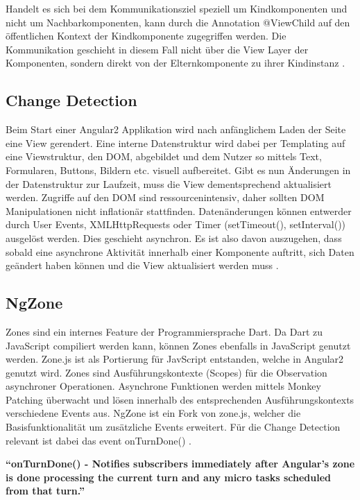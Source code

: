 Handelt es sich bei dem Kommunikationsziel speziell um Kindkomponenten und nicht um Nachbarkomponenten,
kann durch die Annotation @ViewChild auf den öffentlichen Kontext der Kindkomponente zugegriffen werden.
Die Kommunikation geschieht in diesem Fall nicht über die View Layer der Komponenten,
sondern direkt von der Elternkomponente zu ihrer Kindinstanz \cite{ViewC61:online}.


\subsection{Change Detection}
\label{sec:change-detection}

Beim Start einer Angular2 Applikation wird nach anfänglichem Laden der Seite eine View gerendert.
Eine interne Datenstruktur wird dabei per Templating auf eine Viewstruktur, den DOM, abgebildet und dem Nutzer so mittels Text,
Formularen, Buttons, Bildern etc. visuell aufbereitet.
Gibt es nun Änderungen in der Datenstruktur zur Laufzeit, muss die View dementsprechend aktualisiert werden.
Zugriffe auf den DOM sind ressourcenintensiv, daher sollten DOM Manipulationen nicht inflationär stattfinden.
Datenänderungen können entwerder durch User Events, XMLHttpRequests oder Timer (setTimeout(), setInterval()) ausgelöst werden.
Dies geschieht asynchron. Es ist also davon auszugehen, dass sobald eine asynchrone Aktivität innerhalb einer Komponente auftritt,
sich Daten geändert haben können und die View aktualisiert werden muss \cite{changedetection-explained}.

\subsection{NgZone}

Zones sind ein internes Feature der Programmiersprache Dart. Da Dart zu JavaScript compiliert werden kann,
können Zones ebenfalls in JavaScript genutzt werden. Zone.js ist als Portierung für JavScript entstanden, welche in Angular2 genutzt wird.
Zones sind Ausführungskontexte (Scopes) für die Observation asynchroner Operationen.
Asynchrone Funktionen werden mittels Monkey Patching überwacht und lösen innerhalb des entsprechenden Ausführungskontexts verschiedene Events aus.
NgZone ist ein Fork von zone.js, welcher die Basisfunktionalität um zusätzliche Events erweitert.
Für die Change Detection relevant ist dabei das event onTurnDone() \cite{changedetection-explained}.

\vspace{0.3cm}
\textbf{``onTurnDone() - Notifies subscribers immediately after Angular’s zone is done processing the current turn and any micro tasks scheduled from that turn.''}
\cite{ZONESINANGULAR2}
\vspace{0.3cm}

